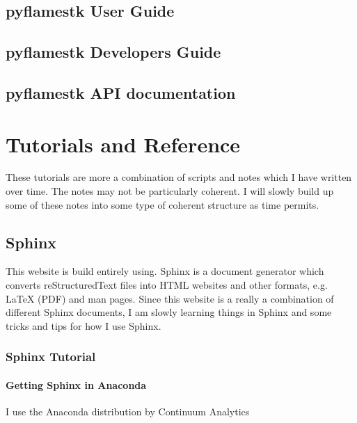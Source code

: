 \documentclass[letterpaper,10pt,english]{sphinxmanual}
\begin{document}
\subsection{pyflamestk User Guide}
\label{\detokenize{pyflamestk/usr/index:pyflamestk-user-guide}}\label{\detokenize{pyflamestk/usr/index::doc}}

\subsection{pyflamestk Developers Guide}
\label{\detokenize{pyflamestk/dev/index:pyflamestk-developers-guide}}\label{\detokenize{pyflamestk/dev/index::doc}}

\subsection{pyflamestk API documentation}
\label{\detokenize{pyflamestk/api/index:pyflamestk-api-documentation}}\label{\detokenize{pyflamestk/api/index::doc}}

\section{Tutorials and Reference}
\label{\detokenize{tutorials:tutorials-and-reference}}\label{\detokenize{tutorials::doc}}
These tutorials are more a combination of scripts and notes which I have written over time.  The notes may not be particularly coherent.  I will slowly build up some of these notes into some type of coherent structure as time permits.


\subsection{Sphinx}
\label{\detokenize{tutorials:sphinx}}
This website is build entirely using.  Sphinx is a document generator which converts reStructuredText files into HTML websites and other formats, e.g. LaTeX (PDF) and man pages.  Since this website is a really a combination of different Sphinx documents, I am slowly learning things in Sphinx and some tricks and tips for how I use Sphinx.


\subsubsection{Sphinx Tutorial}
\label{\detokenize{sphinx_tutorial/index:sphinx-tutorial}}\label{\detokenize{sphinx_tutorial/index::doc}}

\paragraph{Getting Sphinx in Anaconda}
\label{\detokenize{sphinx_tutorial/index:getting-sphinx-in-anaconda}}
I use the Anaconda distribution by Continuum Analytics
\end{document}
